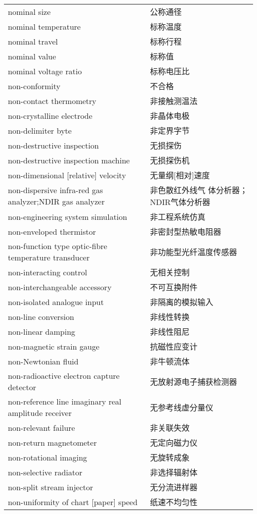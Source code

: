\documentclass[
]{article}
\begin{document}
\begin{longtable}[]{@{}ll@{}}
nominal size & 公称通径 \\
nominal temperature & 标称温度 \\
nominal travel & 标称行程 \\
nominal value & 标称值 \\
nominal voltage ratio & 标称电压比 \\
non-conformity & 不合格 \\
non-contact thermometry & 非接触测温法 \\
non-crystalline electrode & 非晶体电极 \\
non-delimiter byte & 非定界字节 \\
non-destructive inspection & 无损探伤 \\
non-destructive inspection machine & 无损探伤机 \\
non-dimensional {[}relative{]} velocity & 无量纲{[}相对{]}速度 \\
non-dispersive infra-red gas analyzer;NDIR gas analyzer & 非色散红外线气
体分析器；NDIR气体分析器 \\
non-engineering system simulation & 非工程系统仿真 \\
non-enveloped thermistor & 非密封型热敏电阻器 \\
non-function type optic-fibre temperature transducer &
非功能型光纤温度传感器 \\
non-interacting control & 无相关控制 \\
non-interchangeable accessory & 不可互换附件 \\
non-isolated analogue input & 非隔离的模拟输入 \\
non-line conversion & 非线性转换 \\
non-linear damping & 非线性阻尼 \\
non-magnetic strain gauge & 抗磁性应变计 \\
non-Newtonian fluid & 非牛顿流体 \\
non-radioactive electron capture detector & 无放射源电子捕获检测器 \\
non-reference line imaginary real amplitude receiver &
无参考线虚分量仪 \\
non-relevant failure & 非关联失效 \\
non-return magnetometer & 无定向磁力仪 \\
non-rotational imaging & 无旋转成象 \\
non-selective radiator & 非选择辐射体 \\
non-split stream injector & 无分流进样器 \\
non-uniformity of chart {[}paper{]} speed & 纸速不均匀性 \\

\end{longtable}
\end{document}
